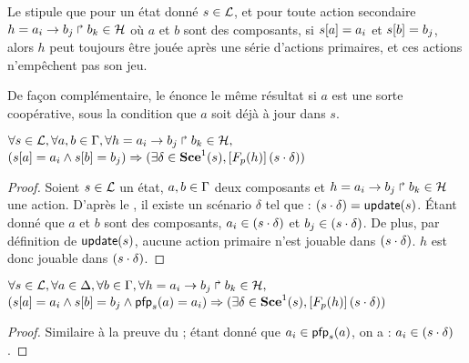 Le  stipule que pour un état donné $s \in \mathcal{L}$, et pour toute action secondaire
$h = a_i\rightarrow b_j\Rsh b_k \in \mathcal{H}$ où $a$ et $b$ sont des composants,
si ${s[a]} = a_i$ et ${s[b]} = b_j$, alors
$h$ peut toujours être jouée après une série d'actions primaires,
et ces actions n'empêchent pas son jeu.

De façon complémentaire, le  énonce le même résultat si $a$ est une sorte coopérative,
sous la condition que $a$ soit déjà à jour dans $s$.

\begin{lemma}
  $\forall s \in \mathcal{L}, \forall a,b \in \Gamma, \forall h = a_i\rightarrow b_j\Rsh b_k \in \mathcal{H},$\\
  $({s[a]} = a_i \wedge {s[b]} = b_j) \Rightarrow
    (\exists \delta \in \mathbf{Sce}^1(s),
    \left[F_{p}(h)\right](s \cdot \delta))$
\end{lemma}

\begin{proof} %
  Soient $s \in \mathcal{L}$ un état, $a,b \in \Gamma$ deux composants et
  $h = a_i\rightarrow b_j\Rsh b_k \in \mathcal{H}$ une action.
  D'après le , il existe un scénario $\delta$ tel que :
  $(s \cdot \delta) = \mathsf{update}(s)$.
  Étant donné que $a$ et $b$ sont des composants,
  $a_i \in (s \cdot \delta)$ et $b_j \in (s \cdot \delta)$.
  De plus, par définition de $\mathsf{update}(s)$, aucune action primaire n'est jouable
  dans $(s \cdot \delta)$.
  $h$ est donc jouable dans $(s \cdot \delta)$.
\end{proof}

\begin{lemma}
  $\forall s \in \mathcal{L}, \forall a \in \Delta, \forall b \in \Gamma,
    \forall h = a_i\rightarrow b_j\Rsh b_k \in \mathcal{H},$\\
  $({s[a]} = a_i \wedge {s[b]} = b_j \wedge \mathsf{pfp}_s(a) = a_i) \Rightarrow
    (\exists \delta \in \mathbf{Sce}^1(s),
    \left[F_{p}(h)\right](s \cdot \delta))$
\end{lemma}

\begin{proof} %
  Similaire à la preuve du  ;
  étant donné que $a_i \in \mathsf{pfp}_s(a)$, on a : $a_i \in (s \cdot \delta)$.
\end{proof}
